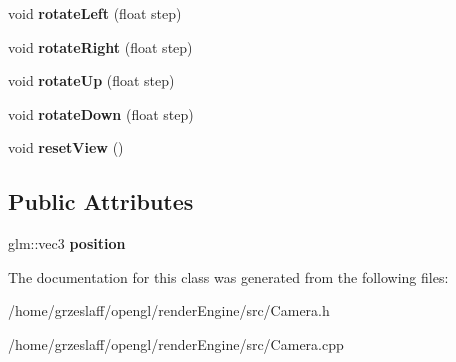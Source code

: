 \begin{DoxyCompactItemize}
\item 
\hypertarget{classCamera_a61e15d0587412375261ca39de2f4776b}{void {\bfseries rotate\-Left} (float step)}\label{classCamera_a61e15d0587412375261ca39de2f4776b}

\item 
\hypertarget{classCamera_a149d10b600ac1d5b91430cdf9a3dae7d}{void {\bfseries rotate\-Right} (float step)}\label{classCamera_a149d10b600ac1d5b91430cdf9a3dae7d}

\item 
\hypertarget{classCamera_abda94b55b7f3ad3a908caaec234c20f1}{void {\bfseries rotate\-Up} (float step)}\label{classCamera_abda94b55b7f3ad3a908caaec234c20f1}

\item 
\hypertarget{classCamera_ac58701deadf29697f408fbf147053a4b}{void {\bfseries rotate\-Down} (float step)}\label{classCamera_ac58701deadf29697f408fbf147053a4b}

\item 
\hypertarget{classCamera_ad7e8f779ab27268fe301c3e4db4187a5}{void {\bfseries reset\-View} ()}\label{classCamera_ad7e8f779ab27268fe301c3e4db4187a5}

\end{DoxyCompactItemize}
\subsection*{Public Attributes}
\begin{DoxyCompactItemize}
\item 
\hypertarget{classCamera_a04b5db2c530d8630660e8cfb93a4b3b5}{glm\-::vec3 {\bfseries position}}\label{classCamera_a04b5db2c530d8630660e8cfb93a4b3b5}

\end{DoxyCompactItemize}


The documentation for this class was generated from the following files\-:\begin{DoxyCompactItemize}
\item 
/home/grzeslaff/opengl/render\-Engine/src/Camera.\-h\item 
/home/grzeslaff/opengl/render\-Engine/src/Camera.\-cpp\end{DoxyCompactItemize}
